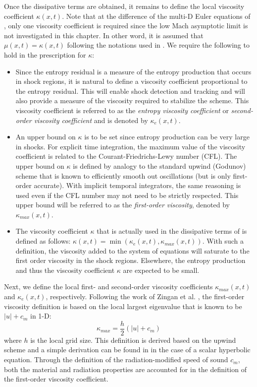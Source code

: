 Once the dissipative terms are obtained, it remains to define the local viscosity coefficient $\kappa(x,t)$. Note that at the difference of the multi-D Euler equations of , only one viscosity coefficient is required since the low Mach asymptotic limit is not investigated in this chapter. In other word, it is assumed that $\mu(x,t) = \kappa(x,t)$ following the notations used in . 
We require the following to hold in the prescription for $\kappa$:
\begin{itemize}
\item Since the entropy residual is a measure of the entropy production that occurs in shock regions, it is natural to define a viscosity coefficient proportional to the entropy residual. This will enable shock detection and tracking and will also provide a measure of the viscosity required to stabilize the scheme. This viscosity coefficient is referred to as the \emph{entropy viscosity coefficient} or \emph{second-order viscosity coefficient} and is denoted by $\kappa_e(x,t)$.
\item An upper bound on $\kappa$ is to be set since entropy production can be very large in shocks. For explicit time integration, the maximum value of the viscosity coefficient is related to the Courant-Friedrichs-Lewy number (CFL). The upper bound on  $\kappa$  is defined by analogy to the standard upwind (Godunov) scheme that is known to efficiently smooth out oscillations (but is only first-order accurate). With implicit temporal integrators, the same reasoning is used even if the CFL number may not need to be strictly respected. This upper bound will be referred to as the \emph{first-order viscosity}, denoted by $\kappa_{max}(x,t)$.  
\item The viscosity coefficient $\kappa$ that is actually used in the dissipative terms of  is defined as follows: $\kappa(x,t) = \min ( \kappa_e(x,t), \kappa_{max}(x,t) )$. With such a definition, the viscosity added to the system of equations will saturate to the first order viscosity in the shock regions. Elsewhere, the entropy production and thus the viscosity coefficient $\kappa$ are expected to be small.
\end{itemize}

Next, we define the local first- and second-order viscosity coefficients $\kappa_{max}(x,t)$ and $\kappa_e(x,t)$, respectively. Following the work of Zingan et al. \cite{valentin}, the first-order viscosity definition is based on the local largest eigenvalue that is known to be $|u| + c_m$ in 1-D:
\begin{equation}
\label{eq:equation8}
\kappa_{max} = \frac{h}{2} \left( |u| + c_m \right)
\end{equation}  
where $h$ is the local grid size. This definition is derived based on the upwind scheme and a simple derivation can be found in \cite{jlg1} in the case of a scalar hyperbolic equation. Through the definition of the radiation-modified speed of sound $c_m$, both the material and radiation properties are accounted for in the definition of the first-order viscosity coefficient.

